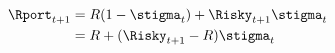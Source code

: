  \begin{equation}\begin{gathered}\begin{aligned}
        \Rport_{t+1}  & = \Rfree(1-\stigma_{t}) + \Risky_{t+1}\stigma_{t} \label{eq:return1}
        \\               & = \Rfree + (\Risky_{t+1}-\Rfree) \stigma_{t} %
      \end{aligned}\end{gathered}\end{equation}
